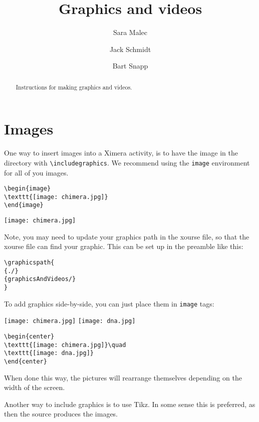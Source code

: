 \documentclass{ximera}
\title{Graphics and videos}
\author{Sara Malec \and Jack Schmidt \and Bart Snapp}
\begin{document}
\begin{abstract}
Instructions for making graphics and videos.
\end{abstract}
\maketitle

\section{Images}
One way to insert images into a Ximera activity, is to have the image
in the directory with \verb|\includegraphics|.  We recommend using the
\verb|image| environment for all of you images.



\begin{verbatim}
\begin{image}
\texttt{[image: chimera.jpg]}
\end{image}
\end{verbatim}
\begin{image}
\texttt{[image: chimera.jpg]}
\end{image}



Note, you may need to update your graphics path in the xourse file, so
that the xourse file can find your graphic. This can be set up in the
preamble like this:
\begin{verbatim}
\graphicspath{
{./}
{graphicsAndVideos/}
}
\end{verbatim}

To add graphics side-by-side, you can just place them in \verb|image| tags:

\begin{center}
  \texttt{[image: chimera.jpg]}\quad
  \texttt{[image: dna.jpg]}
\end{center}
\begin{verbatim}
\begin{center}
\texttt{[image: chimera.jpg]}\quad
\texttt{[image: dna.jpg]}
\end{center}
\end{verbatim}
When done this way, the pictures will rearrange themselves depending on the width of the screen.



Another way to include graphics is to use Tikz. In some sense this is
preferred, as then the source produces the images.
\begin{image}
\end{image}
\end{document}
